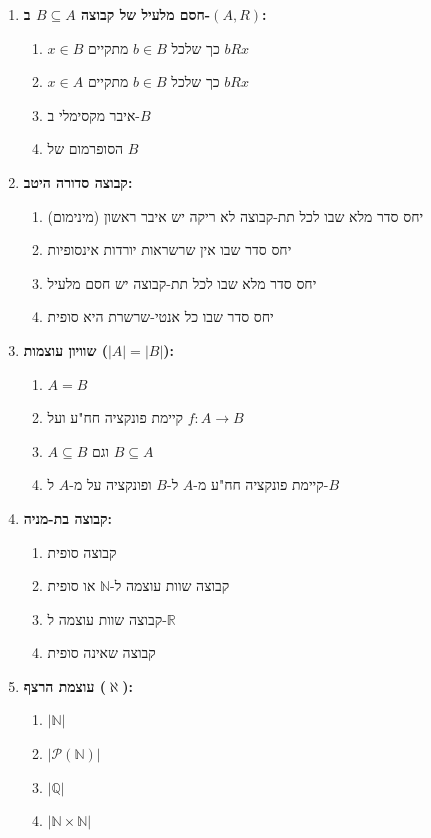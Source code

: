 \documentclass[a4paper,11pt]{article}
\newcommand{\powerset}{\mathcal{P}}
\newcommand{\N}{\mathbb{N}}
\newcommand{\Q}{\mathbb{Q}}
\newcommand{\R}{\mathbb{R}}
\begin{document}
\begin{enumerate}
    \item \textbf{חסם מלעיל של קבוצה \(B \subseteq A\) ב-\((A, R)\):}
          \begin{enumerate}
              \item \(x \in B\) כך שלכל \(b \in B\) מתקיים \(bRx\)
              \item \(x \in A\) כך שלכל \(b \in B\) מתקיים \(bRx\)
              \item איבר מקסימלי ב-\(B\)
              \item הסופרמום של \(B\)
          \end{enumerate}

    \item \textbf{קבוצה סדורה היטב:}
          \begin{enumerate}
              \item יחס סדר מלא שבו לכל תת-קבוצה לא ריקה יש איבר ראשון (מינימום)
              \item יחס סדר שבו אין שרשראות יורדות אינסופיות
              \item יחס סדר מלא שבו לכל תת-קבוצה יש חסם מלעיל
              \item יחס סדר שבו כל אנטי-שרשרת היא סופית
          \end{enumerate}

    \item \textbf{שוויון עוצמות (\(|A|=|B|\)):}
          \begin{enumerate}
              \item \(A=B\)
              \item קיימת פונקציה חח"ע ועל \(f: A \to B\)
              \item \(A \subseteq B\) וגם \(B \subseteq A\)
              \item קיימת פונקציה חח"ע מ-\(A\) ל-\(B\) ופונקציה על מ-\(A\) ל-\(B\)
          \end{enumerate}

    \item \textbf{קבוצה בת-מניה:}
          \begin{enumerate}
              \item קבוצה סופית
              \item קבוצה שוות עוצמה ל-\(\N\) או סופית
              \item קבוצה שוות עוצמה ל-\(\R\)
              \item קבוצה שאינה סופית
          \end{enumerate}

    \item \textbf{עוצמת הרצף (\(\aleph\)):}
          \begin{enumerate}
              \item \(|\N|\)
              \item \(|\powerset(\N)|\)
              \item \(|\Q|\)
              \item \(|\N \times \N|\)
          \end{enumerate}


\end{enumerate}
\end{document}
